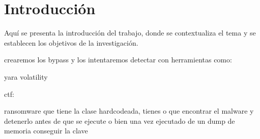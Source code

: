 \chapter{Introducción}

Aquí se presenta la introducción del trabajo, donde se contextualiza el tema y se establecen los objetivos de la investigación.

crearemos los bypass y los intentaremos detectar con herramientas como:

yara 
volatility

ctf:

ransomware que tiene la clase hardcodeada, tienes o que encontrar el malware y detenerlo antes de que se ejecute
o bien una vez ejecutado de un dump de memoria conseguir la clave